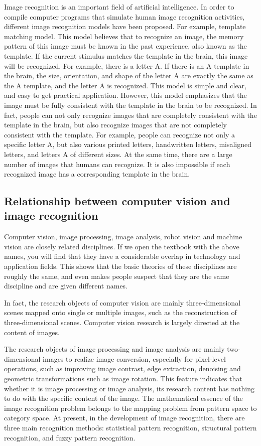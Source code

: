 \documentclass{article}
\begin{document}
Image recognition is an important field of artificial intelligence. In order to compile computer programs that simulate human image recognition activities, different image recognition models have been proposed. For example, template matching model. This model believes that to recognize an image, the memory pattern of this image must be known in the past experience, also known as the template. If the current stimulus matches the template in the brain, this image will be recognized. For example, there is a letter A. If there is an A template in the brain, the size, orientation, and shape of the letter A are exactly the same as the A template, and the letter A is recognized. This model is simple and clear, and easy to get practical application. However, this model emphasizes that the image must be fully consistent with the template in the brain to be recognized. In fact, people can not only recognize images that are completely consistent with the template in the brain, but also recognize images that are not completely consistent with the template. For example, people can recognize not only a specific letter A, but also various printed letters, handwritten letters, misaligned letters, and letters A of different sizes. At the same time, there are a large number of images that humans can recognize. It is also impossible if each recognized image has a corresponding template in the brain.
\subsection{Relationship between computer vision and image recognition}

Computer vision, image processing, image analysis, robot vision and machine vision are closely related disciplines. 
If we open the textbook with the above names, you will find that they have a considerable overlap in technology and application fields. 
This shows that the basic theories of these disciplines are roughly the same, and even makes people suspect that they are the same discipline and are given different names.

In fact, the research objects of computer vision are mainly three-dimensional scenes mapped onto single or multiple images, such as the reconstruction of three-dimensional scenes. Computer vision research is largely directed at the content of images.

The research objects of image processing and image analysis are mainly two-dimensional images to realize image conversion, especially for pixel-level operations, such as improving image contrast, edge extraction, denoising and geometric transformations such as image rotation. 
This feature indicates that whether it is image processing or image analysis, its research content has nothing to do with the specific content of the image. The mathematical essence of the image recognition problem belongs to the mapping problem from pattern space to category space. 
At present, in the development of image recognition, there are three main recognition methods: statistical pattern recognition, structural pattern recognition, and fuzzy pattern recognition.
\end{document}
